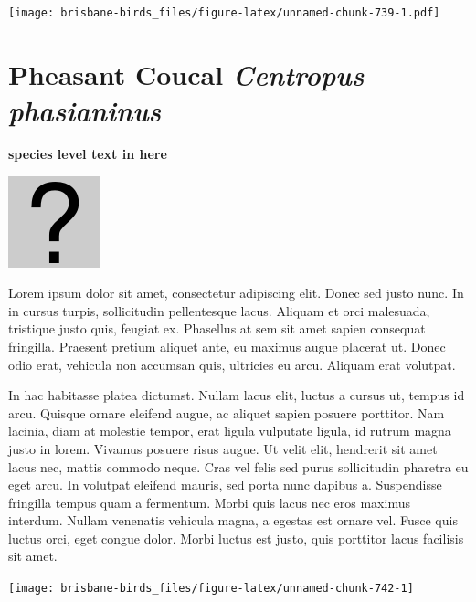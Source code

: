 \documentclass[]{book}
\let\origfigure\figure
\let\endorigfigure\endfigure
\renewenvironment{figure}[1][2] {
  \expandafter\origfigure\expandafter[H]
} {
  \endorigfigure
}
\begin{document}
\begin{figure}
\centering
\texttt{[image: brisbane-birds\_files/figure-latex/unnamed-chunk-739-1.pdf]}
\caption{\label{fig:unnamed-chunk-739}insert figure caption}
\end{figure}

\section{\texorpdfstring{Pheasant Coucal \emph{Centropus
phasianinus}}{Pheasant Coucal Centropus phasianinus}}\label{pheasant-coucal-centropus-phasianinus}

\textbf{species level text in here}

\begin{figure}
\centering
\includegraphics{assets/missing.png}
\caption{No image for species}
\end{figure}

Lorem ipsum dolor sit amet, consectetur adipiscing elit. Donec sed justo
nunc. In in cursus turpis, sollicitudin pellentesque lacus. Aliquam et
orci malesuada, tristique justo quis, feugiat ex. Phasellus at sem sit
amet sapien consequat fringilla. Praesent pretium aliquet ante, eu
maximus augue placerat ut. Donec odio erat, vehicula non accumsan quis,
ultricies eu arcu. Aliquam erat volutpat.

In hac habitasse platea dictumst. Nullam lacus elit, luctus a cursus ut,
tempus id arcu. Quisque ornare eleifend augue, ac aliquet sapien posuere
porttitor. Nam lacinia, diam at molestie tempor, erat ligula vulputate
ligula, id rutrum magna justo in lorem. Vivamus posuere risus augue. Ut
velit elit, hendrerit sit amet lacus nec, mattis commodo neque. Cras vel
felis sed purus sollicitudin pharetra eu eget arcu. In volutpat eleifend
mauris, sed porta nunc dapibus a. Suspendisse fringilla tempus quam a
fermentum. Morbi quis lacus nec eros maximus interdum. Nullam venenatis
vehicula magna, a egestas est ornare vel. Fusce quis luctus orci, eget
congue dolor. Morbi luctus est justo, quis porttitor lacus facilisis sit
amet.

\begin{figure}
\texttt{[image: brisbane-birds\_files/figure-latex/unnamed-chunk-742-1]} \caption{insert figure caption}\label{fig:unnamed-chunk-742}
\end{figure}
\end{document}
